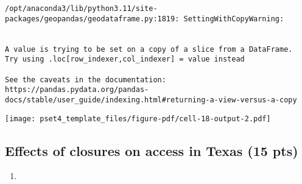 \documentclass[
  letterpaper,
  DIV=11,
  numbers=noendperiod]{scrartcl}
\providecommand{\tightlist}{%
  \setlength{\itemsep}{0pt}\setlength{\parskip}{0pt}}\usepackage{longtable,booktabs,array}
\begin{document}
\begin{verbatim}
/opt/anaconda3/lib/python3.11/site-packages/geopandas/geodataframe.py:1819: SettingWithCopyWarning:


A value is trying to be set on a copy of a slice from a DataFrame.
Try using .loc[row_indexer,col_indexer] = value instead

See the caveats in the documentation: https://pandas.pydata.org/pandas-docs/stable/user_guide/indexing.html#returning-a-view-versus-a-copy
\end{verbatim}

\texttt{[image: pset4\_template\_files/figure-pdf/cell-18-output-2.pdf]}

\subsection{Effects of closures on access in Texas (15
pts)}\label{effects-of-closures-on-access-in-texas-15-pts}

\begin{enumerate}
\def\labelenumi{\arabic{enumi}.}
\tightlist
\item
\end{enumerate}
\end{document}
